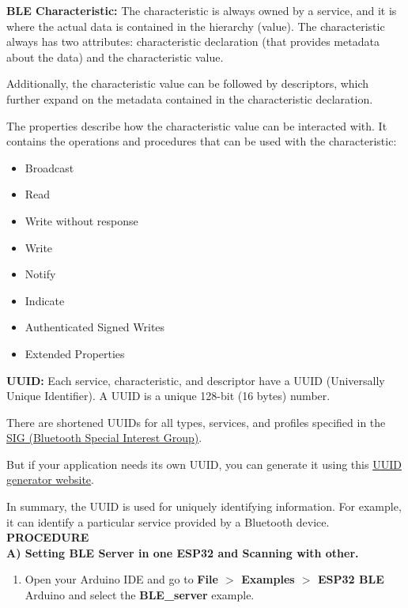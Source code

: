 \documentclass[12pt,a4paper]{article}
\begin{document}
\begin{sloppypar}
\begin{justify}
\noindent \textbf{BLE Characteristic: }The characteristic is always owned by a service, and it is where the actual data is contained in the hierarchy (value). The characteristic always has two attributes: characteristic declaration (that provides metadata about the data) and the characteristic value.\par
\noindent Additionally, the characteristic value can be followed by descriptors, which further expand on the metadata contained in the characteristic declaration.\par
\noindent The properties describe how the characteristic value can be interacted with. It contains the operations and procedures that can be used with the characteristic:

\begin{itemize}
 \setlength\itemsep{-0.3em}
 \item Broadcast
\item Read
\item Write without response
\item Write
\item Notify
\item Indicate
\item Authenticated Signed Writes
\item Extended Properties
\end{itemize}


\noindent \textbf{UUID: } Each service, characteristic, and descriptor have a UUID (Universally Unique Identifier). A UUID is a unique 128-bit (16 bytes) number.\par
\noindent There are shortened UUIDs for all types, services, and profiles specified in the
\underline{SIG (Bluetooth Special Interest Group)}.\par
\noindent But if your application needs its own UUID, you can generate it using this  \underline{UUID generator website}.\par
\noindent In summary, the UUID is used for uniquely identifying information. For example, it can identify a particular service provided by a Bluetooth device.\\[21pt]
\noindent \textbf{\large PROCEDURE}\\[6pt]
\textbf{A) Setting BLE Server in one ESP32 and Scanning with other.}
\vspace{-3mm}
\begin{enumerate}
\setlength\itemsep{-0.3em}
\item  Open your Arduino IDE and go to \textbf{ File $>$ Examples $>$ ESP32 BLE } Arduino and select the \textbf{ BLE\_server} example.


\end{enumerate}
\end{justify}
\end{sloppypar}
\end{document}
